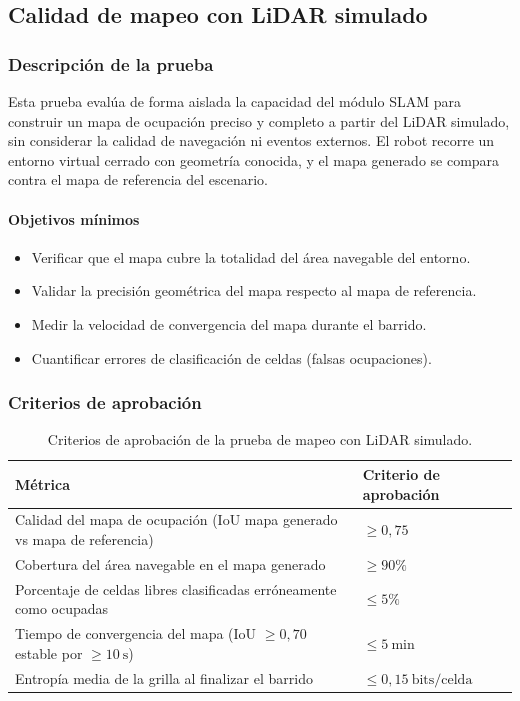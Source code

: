 \subsection{Calidad de mapeo con LiDAR simulado}

\subsubsection{Descripción de la prueba}

Esta prueba evalúa de forma aislada la capacidad del módulo SLAM para construir un mapa de ocupación preciso y completo a partir del LiDAR simulado, sin considerar la calidad de navegación ni eventos externos. El robot recorre un entorno virtual cerrado con geometría conocida, y el mapa generado se compara contra el mapa de referencia del escenario.

\paragraph{Objetivos mínimos}
\begin{itemize}
    \item Verificar que el mapa cubre la totalidad del área navegable del entorno.
    \item Validar la precisión geométrica del mapa respecto al mapa de referencia.
    \item Medir la velocidad de convergencia del mapa durante el barrido.
    \item Cuantificar errores de clasificación de celdas (falsas ocupaciones).
\end{itemize}

\subsubsection{Criterios de aprobación}

\begin{table}[H]
\centering
\small
\begin{tabular}{p{8.8cm} p{4.1cm}}
\toprule
\textbf{Métrica} & \textbf{Criterio de aprobación} \\
\midrule
Calidad del mapa de ocupación (IoU mapa generado vs mapa de referencia) & $\geq 0{,}75$ \\
Cobertura del área navegable en el mapa generado & $\geq 90\%$ \\
Porcentaje de celdas libres clasificadas erróneamente como ocupadas & $\leq 5\%$ \\
Tiempo de convergencia del mapa (IoU $\geq 0{,}70$ estable por $\geq 10\ \text{s}$) & $\leq 5\ \text{min}$ \\
Entropía media de la grilla al finalizar el barrido & $\leq 0{,}15\ \text{bits/celda}$ \\
\bottomrule
\end{tabular}
\caption{Criterios de aprobación de la prueba de mapeo con LiDAR simulado.}
\label{tab:criterios_prueba_slam}
\end{table}

